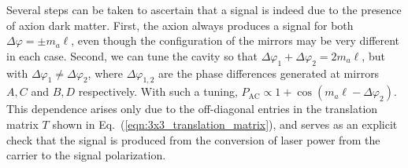 \documentclass[aps,prd,nofootinbib,twocolumn,superscriptaddress,preprintnumbers,letterpaper, longbibliography]{revtex4-1}
\begin{document}
Several steps can be taken to ascertain that a signal is indeed due to the presence of axion dark matter. First, the axion always produces a signal for both $\Delta \varphi = \pm m_a \ell$, even though the configuration of the mirrors may be very different in each case. Second, we can tune the cavity so that $\Delta \varphi_1 + \Delta \varphi_2 = 2 m_a \ell$, but with $\Delta \varphi_1 \neq \Delta \varphi_2$, where $\Delta \varphi_{1,2}$ are the phase differences generated at mirrors $A,C$ and $B,D$ respectively. With such a tuning, $P_\text{AC} \propto 1 + \cos(m_a \ell - \Delta \varphi_2)$. This dependence arises only due to the off-diagonal entries in the translation matrix $T$ shown in Eq.~(\ref{eqn:3x3_translation_matrix}), and serves as an explicit check that the signal is produced from the conversion of laser power from the carrier to the signal polarization.
\end{document}
